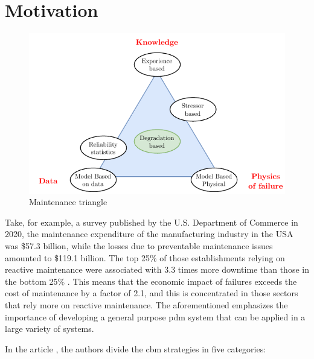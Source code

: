 \section{Motivation}
\label{sec:motivation}

\begin{figure}
    \centering
    \includegraphics[scale=1.3]{images/Intro/MaintTriangle.pdf}
    \caption{Maintenance triangle}
    \label{fig:MaintTriangle}
\end{figure} 

Take, for example, a survey published by the U.S. Department of Commerce in 2020, the maintenance expenditure of the manufacturing industry in the USA was \$57.3 billion, while the losses due to preventable maintenance issues amounted to \$119.1 billion. The top 25\% of those establishments relying on reactive maintenance were associated with 3.3 times more downtime than those in the bottom 25\% \cite{NIST}. This means that the economic impact of failures exceeds the cost of maintenance by a factor of 2.1, and this is concentrated in those sectors that rely more on reactive maintenance. The aforementioned emphasizes the importance of developing a general purpose \gls{pdm} system that can be applied in a large variety of systems.

In the article \cite{Maintenance_cat}, the authors divide the \gls{cbm} strategies in five categories:

